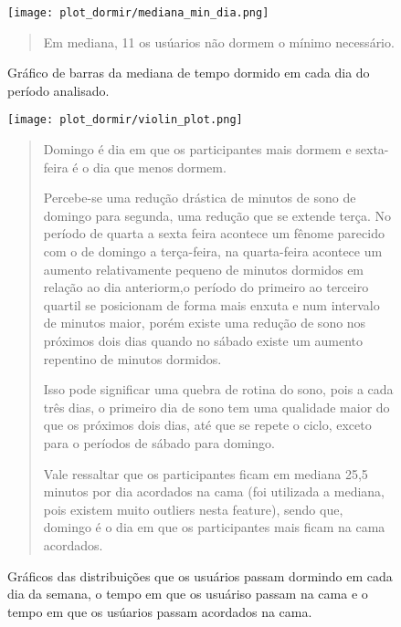 \documentclass[a4paper, oneside]{report}
\begin{document}
\begin{figure}[h]
\centering %
\texttt{[image: plot\_dormir/mediana\_min\_dia.png]} %
\caption{Gráfico de barras da mediana de tempo dormido em cada dia do período analisado.}
\label{figura:Figura 2}
\begin{quotation}
Em mediana, 11 os usúarios não dormem o mínimo necessário.
\end{quotation}
\end{figure}


\begin{figure}[h]
\centering %
\texttt{[image: plot\_dormir/violin\_plot.png]} %
\caption{Gráficos das distribuições que os usuários passam dormindo em cada dia da semana, o tempo em que os usuáriso passam na cama e o tempo em que os usúarios passam acordados na cama.}
\label{figura :Figura 3}
\begin{quotation}
Domingo é dia em que os participantes mais dormem e sexta-feira é o dia que menos dormem.

Percebe-se uma redução drástica de minutos de sono de domingo para segunda, uma redução que se extende terça. No período de quarta a sexta feira acontece um fênome parecido com o de domingo a terça-feira, na quarta-feira acontece um aumento relativamente pequeno de minutos dormidos em relação ao dia anteriorm,o período do primeiro ao terceiro quartil se posicionam de forma mais enxuta e num intervalo de minutos maior, porém existe uma redução de sono nos próximos dois dias quando no sábado existe um aumento repentino de minutos dormidos.

Isso pode significar uma quebra de rotina do sono, pois a cada três dias, o primeiro dia de sono tem uma qualidade maior do que os próximos dois dias, até que se repete o ciclo, exceto para o períodos de sábado para domingo.

Vale ressaltar que os participantes ficam em mediana 25,5 minutos por dia acordados na cama (foi utilizada a mediana, pois existem muito outliers nesta feature), sendo que, domingo é o dia em que os participantes mais ficam na cama acordados.
\end{quotation}
\end{figure}
\end{document}

